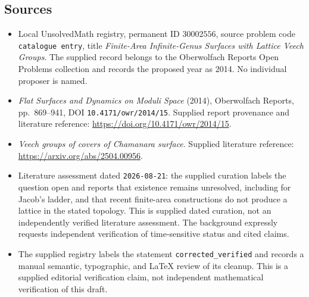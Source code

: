\documentclass[11pt]{article}
\begin{document}
\subsection{Sources}
\begin{itemize}
\item Local UnsolvedMath registry, permanent ID \(30002556\), source problem code \texttt{catalogue entry}, title \emph{Finite-Area Infinite-Genus Surfaces with Lattice Veech Groups}. The supplied record belongs to the Oberwolfach Reports Open Problems collection and records the proposed year as 2014. No individual proposer is named.
\item \emph{Flat Surfaces and Dynamics on Moduli Space} (2014), Oberwolfach Reports, pp.\ 869--941, DOI \texttt{10.4171/owr/2014/15}. Supplied report provenance and literature reference: \url{https://doi.org/10.4171/owr/2014/15}.
\item \emph{Veech groups of covers of Chamanara surface}. Supplied literature reference: \url{https://arxiv.org/abs/2504.00956}.
\item Literature assessment dated \texttt{2026-08-21}: the supplied curation labels the question open and reports that existence remains unresolved, including for Jacob's ladder, and that recent finite-area constructions do not produce a lattice in the stated topology. This is supplied dated curation, not an independently verified literature assessment. The background expressly requests independent verification of time-sensitive status and cited claims.
\item The supplied registry labels the statement \texttt{corrected\_verified} and records a manual semantic, typographic, and LaTeX review of its cleanup. This is a supplied editorial verification claim, not independent mathematical verification of this draft.
\end{itemize}
\end{document}

